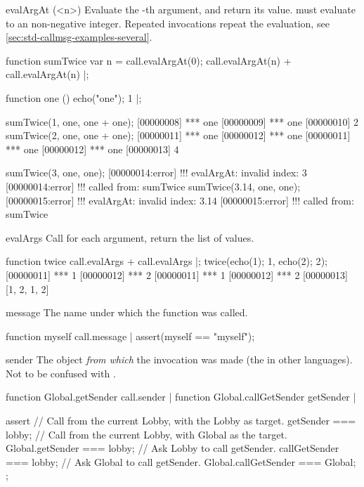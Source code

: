 \begin{urbiscriptapi}
\item[evalArgAt](<n>)%
  Evaluate the -th argument, and return its value.  
  must evaluate to an non-negative integer.  Repeated invocations
  repeat the evaluation, see
  \autoref{sec:std-callmsg-examples-several}.
\begin{urbiscript}
function sumTwice
{
  var n = call.evalArgAt(0);
  call.evalArgAt(n) + call.evalArgAt(n)
}|;

function one () { echo("one"); 1 }|;

sumTwice(1, one, one + one);
[00000008] *** one
[00000009] *** one
[00000010] 2
sumTwice(2, one, one + one);
[00000011] *** one
[00000012] *** one
[00000011] *** one
[00000012] *** one
[00000013] 4

sumTwice(3, one, one);
[00000014:error] !!! evalArgAt: invalid index: 3
[00000014:error] !!!    called from: sumTwice
sumTwice(3.14, one, one);
[00000015:error] !!! evalArgAt: invalid index: 3.14
[00000015:error] !!!    called from: sumTwice
\end{urbiscript}

\item[evalArgs]%
  Call  for each argument, return the list of values.
\begin{urbiscript}
function twice
{
  call.evalArgs + call.evalArgs
}|;
twice({echo(1); 1}, {echo(2); 2});
[00000011] *** 1
[00000012] *** 2
[00000011] *** 1
[00000012] *** 2
[00000013] [1, 2, 1, 2]
\end{urbiscript}

\item[message]
  The name under which the function was called.
\begin{urbiscript}
function myself { call.message }|
assert(myself == "myself");
\end{urbiscript}

\item[sender]%
  The object \emph{from which} the invocation was made (the  in
  other languages).  Not to be confused with .
\begin{urbiscript}
function Global.getSender { call.sender } |
function Global.callGetSender { getSender } |

assert
{
  // Call from the current Lobby, with the Lobby as target.
  getSender === lobby;
  // Call from the current Lobby, with Global as the target.
  Global.getSender === lobby;
  // Ask Lobby to call getSender.
  callGetSender === lobby;
  // Ask Global to call getSender.
  Global.callGetSender === Global;
};
\end{urbiscript}


\end{urbiscriptapi}

